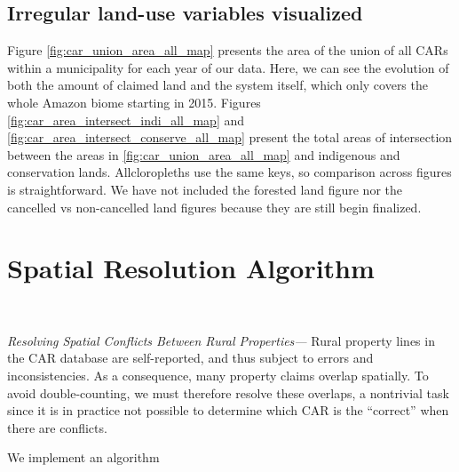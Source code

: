 \documentclass[12pt]{article}
\begin{document}
\begin{appendices}
    \subsection{Irregular land-use variables visualized}

    Figure \ref{fig:car_union_area_all_map} presents the area of the union of all CARs within a municipality for each year of our data. Here, we can see the evolution of both the amount of claimed land and the system itself, which only covers the whole Amazon biome starting in 2015. Figures \ref{fig:car_area_intersect_indi_all_map} and \ref{fig:car_area_intersect_conserve_all_map} present the total areas of intersection between the areas in \ref{fig:car_union_area_all_map} and indigenous and conservation lands. Allcloropleths use the same keys, so comparison across figures is straightforward. We have not included the forested land figure nor the cancelled vs non-cancelled land figures because they are still begin finalized. 


\clearpage

\section{Spatial Resolution Algorithm} \label{appendix:2}


\ 

\textit{Resolving Spatial Conflicts Between Rural Properties---} Rural property lines in the CAR database are self-reported, and thus subject to errors and inconsistencies. As a consequence, many property claims overlap spatially. To avoid double-counting, we must therefore resolve these overlaps, a nontrivial task since it is in practice not possible to determine which CAR is the ``correct'' when there are conflicts. 
\ 

\quad We implement an algorithm
 

\end{appendices}
\end{document}
